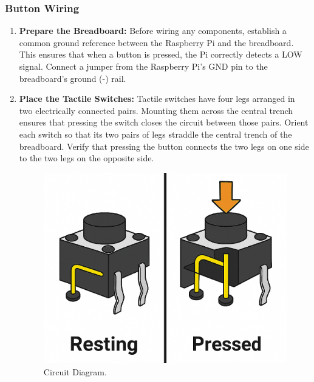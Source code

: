 \documentclass[a4paper,11pt]{article}
\begin{document}
\subsubsection*{Button Wiring}
\begin{enumerate}
    \item \textbf{Prepare the Breadboard:} Before wiring any components, establish a common ground reference between 
    the Raspberry Pi and the breadboard. This ensures that when a button is pressed, the Pi correctly detects a LOW signal. 
    Connect a jumper from the Raspberry Pi's GND pin to the breadboard's ground (-) rail.
\newpage
    \item \textbf{Place the Tactile Switches:} Tactile switches have four legs arranged in two electrically connected pairs. 
    Mounting them across the central trench ensures that pressing the switch closes the circuit between those pairs.  
    Orient each switch so that its two pairs of legs straddle the central trench of the breadboard.
    Verify that pressing the button connects the two legs on one side to the two legs on the opposite side.

    
    \begin{figure}[h] %
        \centering
        \includegraphics[width=.5\textwidth]{fig3.png} %
        \caption{Circuit Diagram.}
        \label{fig:button}
    \end{figure}


\end{enumerate}
\end{document}
